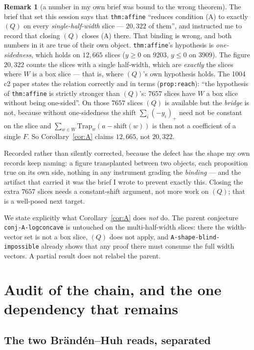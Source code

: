 \documentclass[11pt]{article}
\theoremstyle{plain}
\theoremstyle{definition}
\newtheorem{remark}[theorem]{Remark}
\begin{document}
\begin{remark}[a number in my own brief was bound to the wrong theorem]\label{rem:reach}
The brief that set this session says that \texttt{thm:affine} ``reduces condition (A) to
exactly $(Q)$ on every \emph{single-half-width} slice --- $20{,}322$ of them'', and
instructed me to record that closing $(Q)$ closes (A) there. That binding is wrong, and
both numbers in it are true of their own object. \texttt{thm:affine}'s hypothesis is
\emph{one-sidedness}, which holds on $12{,}665$ slices ($y\ge0$ on $9203$, $y\le0$ on
$3909$). The figure $20{,}322$ counts the slices with a single half-width, which are
\emph{exactly} the slices where $W$ is a box slice --- that is, where $(Q)$'s own hypothesis
holds. The 1004\,c2 paper states the relation correctly and in terms
(\texttt{prop:reach}): ``the hypothesis of \texttt{thm:affine} is strictly stronger
than $(Q)$'s: $7657$ slices have $W$ a box slice without being one-sided''. On those
$7657$ slices $(Q)$ is available but the \emph{bridge} is not, because without
one-sidedness the shift $\sum_i(-y_i)_+$ need not be constant on the slice and
$\sum_{w\in W}\mathrm{Trap}_w(a-\mathrm{shift}(w))$ is then not a coefficient of a single
$F$. So Corollary~\ref{cor:A} claims $12{,}665$, not $20{,}322$.

Recorded rather than silently corrected, because the defect has the shape my own records
keep naming: a figure transplanted between two objects, each proposition true on its own
side, nothing in any instrument grading the \emph{binding} --- and the artifact that
carried it was the brief I wrote to prevent exactly this. Closing the extra $7657$ slices
needs a constant-shift argument, not more work on $(Q)$; that is a well-posed next target.
\end{remark}

We state explicitly what Corollary~\ref{cor:A} does \emph{not} do. The parent conjecture
\texttt{conj-A-logconcave} is untouched on the multi-half-width slices: there the
width-vector set is not a box slice, $(Q)$ does not apply, and
\texttt{A-shape-blind-impossible} already shows that any proof there must consume the full
width vectors. A partial result does not relabel the parent.

\section{Audit of the chain, and the one dependency that remains}\label{sec:audit}

\subsection*{The two Brändén--Huh reads, separated}
\end{document}
